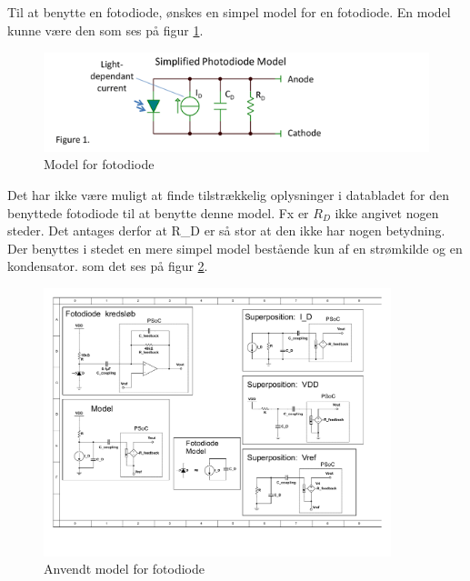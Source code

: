 \documentclass[HardwareDesign/HardwareDesign_main.tex]{subfiles}
\begin{document}
Til at benytte en fotodiode, ønskes en simpel model for en fotodiode. En model kunne være den som ses på figur \ref{fig:photodiodeModel}.

\begin{figure}[H]
    \centering
    \includegraphics[width=\textwidth]{HardwareDesign/CupSensor/graphics/photodiodeModel.png}
    \caption{Model for fotodiode}
    \label{fig:photodiodeModel}
\end{figure}

Det har ikke være muligt at finde tilstrækkelig oplysninger i databladet for den benyttede fotodiode til at benytte denne model. Fx er $R_D$ ikke angivet nogen steder. Det antages derfor at R\_D er så stor at den ikke har nogen betydning. Der benyttes i stedet en mere simpel model bestående kun af en strømkilde og en kondensator. som det ses på figur \ref{fig:photodiodeModelSimple}.

\begin{figure}[H]
    \centering
    \includegraphics[width=0.9\textwidth,trim={4.1in 2.1in 4.75in 4.7in},clip, page=1]{HardwareDesign/CupSensor/graphics/Superposition.pdf}
    \caption{Anvendt model for fotodiode}
    \label{fig:photodiodeModelSimple}
\end{figure}
\end{document}
